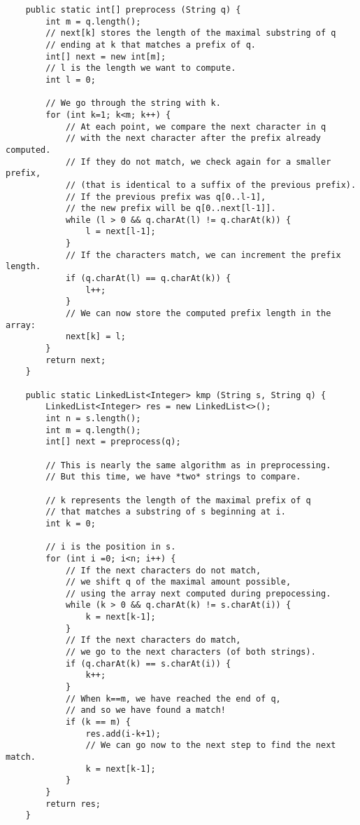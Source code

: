 \documentclass[a4paper,11pt,openany,extrafontsizes,twoside,article]{memoir}
\begin{document}
\begin{verbatim}
    public static int[] preprocess (String q) {
        int m = q.length();
        // next[k] stores the length of the maximal substring of q
        // ending at k that matches a prefix of q.
        int[] next = new int[m];
        // l is the length we want to compute.
        int l = 0;

        // We go through the string with k.
        for (int k=1; k<m; k++) {
            // At each point, we compare the next character in q
            // with the next character after the prefix already computed.
            // If they do not match, we check again for a smaller prefix,
            // (that is identical to a suffix of the previous prefix).
            // If the previous prefix was q[0..l-1],
            // the new prefix will be q[0..next[l-1]].
            while (l > 0 && q.charAt(l) != q.charAt(k)) {
                l = next[l-1];
            }
            // If the characters match, we can increment the prefix length.
            if (q.charAt(l) == q.charAt(k)) {
                l++;
            }
            // We can now store the computed prefix length in the array:
            next[k] = l;
        }
        return next;
    }

    public static LinkedList<Integer> kmp (String s, String q) {
        LinkedList<Integer> res = new LinkedList<>();
        int n = s.length();
        int m = q.length();
        int[] next = preprocess(q);

        // This is nearly the same algorithm as in preprocessing.
        // But this time, we have *two* strings to compare.

        // k represents the length of the maximal prefix of q
        // that matches a substring of s beginning at i.
        int k = 0;

        // i is the position in s.
        for (int i =0; i<n; i++) {
            // If the next characters do not match,
            // we shift q of the maximal amount possible,
            // using the array next computed during prepocessing.
            while (k > 0 && q.charAt(k) != s.charAt(i)) {
                k = next[k-1];
            }
            // If the next characters do match,
            // we go to the next characters (of both strings).
            if (q.charAt(k) == s.charAt(i)) {
                k++;
            }
            // When k==m, we have reached the end of q,
            // and so we have found a match!
            if (k == m) {
                res.add(i-k+1);
                // We can go now to the next step to find the next match.
                k = next[k-1];
            }
        }
        return res;
    }
\end{verbatim}
\end{document}
